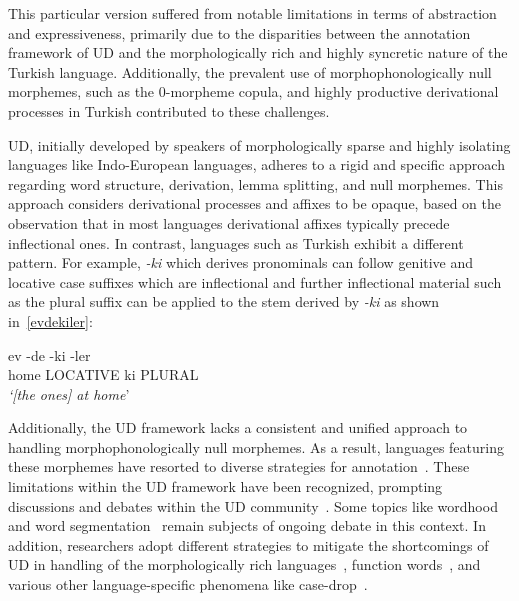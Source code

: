 This particular version suffered from notable limitations in terms of abstraction and expressiveness, primarily due to the disparities between the annotation framework of UD and the morphologically rich and highly syncretic nature of the Turkish language.
Additionally, the prevalent use of morphophonologically null morphemes, such as the 0-morpheme copula, and highly productive derivational processes in Turkish contributed to these challenges.

UD, initially developed by speakers of morphologically sparse and highly isolating languages like Indo-European languages, adheres to a rigid and specific approach regarding word structure, derivation, lemma splitting, and null morphemes.
This approach considers derivational processes and affixes to be opaque, based on the observation that in most languages derivational affixes typically precede inflectional ones.
In contrast, languages such as Turkish exhibit a different pattern.
For example, \textit{-ki} which derives pronominals can follow genitive and locative case suffixes which are inflectional and further inflectional material such as the plural suffix can be applied to the stem derived by \textit{-ki} as shown in~\ref{evdekiler}:

\begin{exe}
\label{evdekiler}
    \ex 
    \gll ev -de -ki -ler \\
    home LOCATIVE ki PLURAL \\
    \glt \textit{`{[the ones]} at home}' \\
\end{exe}

Additionally, the UD framework lacks a consistent and unified approach to handling morphophonologically null morphemes.
As a result, languages featuring these morphemes have resorted to diverse strategies for annotation~\cite{marton2013dependency, ravishankar2017universal, dyer2022new}.
These limitations within the UD framework have been recognized, prompting discussions and debates within the UD community~\cite{gerdes2016dependency}.
Some topics like wordhood and word segmentation~\cite{seyoum2018universal} remain subjects of ongoing debate in this context.
In addition, researchers adopt different strategies to mitigate the shortcomings of UD in handling of the morphologically rich languages~\cite{more2016data, vincze2017universal, seyoum2018universal}, function words~\cite{osborne2019status}, and various other language-specific phenomena like case-drop~\cite{sundar-ram-lalitha-devi-2021-dependency-parsing}.

